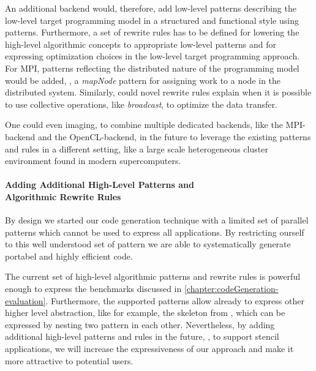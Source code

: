 An additional backend would, therefore, add low-level patterns describing the low-level target programming model in a structured and functional style using patterns.
Furthermore, a set of rewrite rules has to be defined for lowering the high-level algorithmic concepts to appropriate low-level patterns and for expressing optimization choices in the low-level target programming approach.
For MPI, patterns reflecting the distributed nature of the programming model would be added, \eg, a \emph{mapNode} pattern for assigning work to a node in the distributed system.
Similarly, could novel rewrite rules explain when it is possible to use collective operations, like \emph{broadcast}, to optimize the data transfer.

One could even imaging, to combine multiple dedicated backends, like the MPI-backend and the OpenCL-backend, in the future to leverage the existing patterns and rules in a different setting, like a large scale heterogeneous cluster environment found in modern supercomputers.

\paragraph{Adding Additional High-Level Patterns and\\ Algorithmic Rewrite Rules}
By design we started our code generation technique with a limited set of parallel patterns which cannot be used to express all applications.
By restricting ourself to this well understood set of pattern we are able to systematically generate portabel and highly efficient code.

The current set of high-level algorithmic patterns and rewrite rules is powerful enough to express the benchmarks discussed in \autoref{chapter:codeGeneration-evaluation}.
Furthermore, the supported patterns allow already to express other higher level abstraction, like for example, the \allpairs skeleton from \SkelCL, which can be expressed by nesting two \map pattern in each other.
Nevertheless, by adding additional high-level patterns and rules in the future, \eg, to support stencil applications, we will increase the expressiveness of our approach and make it more attractive to potential users.

